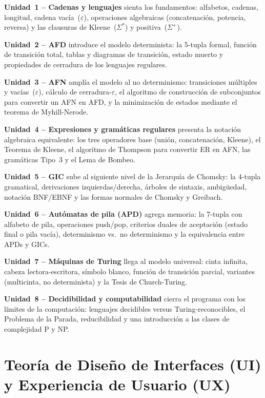 \textbf{Unidad~1 -- Cadenas y lenguajes} sienta los fundamentos: alfabetos, cadenas, longitud,
cadena vacía~($\varepsilon$), operaciones algebraicas (concatenación, potencia, reversa) y las
clausuras de Kleene~($\Sigma^{*}$) y positiva~($\Sigma^{+}$).

\textbf{Unidad~2 -- AFD} introduce el modelo determinista: la 5-tupla formal, función de
transición total, tablas y diagramas de transición, estado muerto y propiedades de cerradura
de los lenguajes regulares.

\textbf{Unidad~3 -- AFN} amplía el modelo al no determinismo: transiciones múltiples y
vacías~($\varepsilon$), cálculo de cerradura-$\varepsilon$, el algoritmo de construcción de
subconjuntos para convertir un AFN en AFD, y la minimización de estados mediante el teorema
de Myhill-Nerode.

\textbf{Unidad~4 -- Expresiones y gramáticas regulares} presenta la notación algebraica
equivalente: los tres operadores base (unión, concatenación, Kleene), el Teorema de Kleene,
el algoritmo de Thompson para convertir ER en AFN, las gramáticas Tipo~3 y el Lema de Bombeo.

\textbf{Unidad~5 -- GIC} sube al siguiente nivel de la Jerarquía de Chomsky: la 4-tupla
gramatical, derivaciones izquierdas/derecha, árboles de sintaxis, ambigüedad, notación
BNF/EBNF y las formas normales de Chomsky y Greibach.

\textbf{Unidad~6 -- Autómatas de pila (APD)} agrega memoria: la 7-tupla con alfabeto de pila,
operaciones push/pop, criterios duales de aceptación (estado final o pila vacía), determinismo
vs.\ no determinismo y la equivalencia entre APDs y GICs.

\textbf{Unidad~7 -- Máquinas de Turing} llega al modelo universal: cinta infinita, cabeza
lectora-escritora, símbolo blanco, función de transición parcial, variantes (multicinta, no
determinista) y la Tesis de Church-Turing.

\textbf{Unidad~8 -- Decidibilidad y computabilidad} cierra el programa con los límites de la
computación: lenguajes decidibles versus Turing-reconocibles, el Problema de la Parada,
reducibilidad y una introducción a las clases de complejidad P y NP.

\section{Teoría de Diseño de Interfaces (UI) y Experiencia de Usuario (UX)}
\label{sec:ui_ux}

